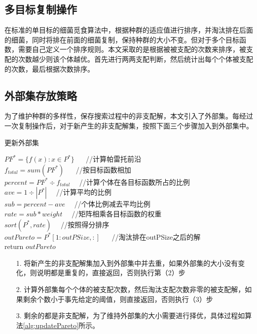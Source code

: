     \subsection{多目标复制操作}
    在标准的单目标的细菌觅食算法中，根据种群的适应值进行排序，并淘汰排在后面的细菌，同时将排在前面的细菌复制，保持种群的大小不变。但对于多个目标函数，需要自己定义一个排序规则。本文采取的是根据被被支配的次数来排序，被支配的次数越少则该个体越优。首先进行两两支配判断，然后统计出每个个体被支配的次数，最后根据次数排序。

    \subsection{外部集存放策略}
    为了维护种群的多样性，保存搜索过程中的非支配解，本文引入了外部集。每经过一次复制操作后，对于新产生的非支配解集，按照下面三个步骤加入到外部集中。
    \begin{algorithm}[htbp]
        \caption{更新外部集} \label{alg:updatePareto}
        $PF^*= \{f(x):x\in P^*\}$ 　 //计算帕雷托前沿 \\
        $f_{total} = sum(PF^*)$  　 //按目标函数相加\\
        $percent = PF^* \div　f_{total} $　 //计算个体在各目标函数所占的比例\\
        $ave = 1 \div |P^*|$　 //计算平均的比例\\
        $sub = percent - ave$　 //个体比例减去平均比例 \\
        $rate = sub \ast weight$　 //矩阵相乘各目标函数的权重\\
        $sort(P^*, rate)$　 //按照得分排序\\
        $outPareto = P^*[1:outPSize,:]$ 　 //淘汰排在outPSize之后的解\\
        return $outPareto$
    \end{algorithm}
    \begin{enumerate}
       \item[1.] 将新产生的非支配解集加入到外部集中并去重，如果外部集的大小没有变化，则说明都是重复的，直接返回，否则执行第（2）步
       \item[2.] 计算外部集每个个体的被支配次数，然后淘汰支配次数非零的被支配解，如果剩余个数小于事先给定的阈值，则直接返回，否则执行（3）步
       \item[3.] 剩余的都是非支配解，为了维持外部集的大小需要进行择优，具体过程如算法\ref{alg:updatePareto}所示。
    \end{enumerate} 

